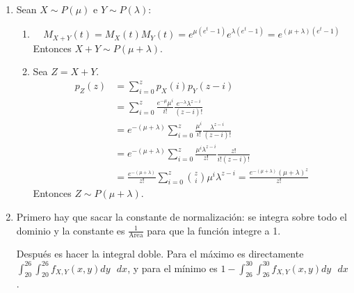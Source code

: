 \begin{enumerate}
	\item
		Sean $X\sim P(\mu)$ e $Y\sim P(\lambda)$:
		\begin{enumerate}
			\item
				$$M_{X+Y}(t) = M_X(t) M_Y(t) = e^{\mu(e^t-1)}e^{\lambda(e^t-1)} = e^{(\mu+\lambda)(e^t-1)}$$
				Entonces $X+Y\sim P(\mu+\lambda)$.
			\item
				Sea $Z = X+Y$.
				\begin{align*}
					p_Z(z)	& = \sum_{i=0}^z p_X(i)p_Y(z-i)	\\
							& = \sum_{i=0}^z \frac{e^{-\mu}\mu^i}{i!}\frac{e^{-\lambda}\lambda^{z-i}}{(z-i)!}	\\
							& = e^{-(\mu+\lambda)}\sum_{i=0}^z \frac{\mu^i}{i!}\frac{\lambda^{z-i}}{(z-i)!}		\\
							& = e^{-(\mu+\lambda)}\sum_{i=0}^z \frac{\mu^i\lambda^{z-i}}{z!} \frac{z!}{i!(z-i)!}		\\
							& = \frac{e^{-(\mu+\lambda)}}{z!}\sum_{i=0}^z \binom{z}{i}\mu^i\lambda^{z-i} = 	\frac{e^{-(\mu+\lambda)}(\mu+\lambda)^z}{z!}
				\end{align*}
				Entonces $Z\sim P(\mu+\lambda)$.
		\end{enumerate}
		
	\item
		Primero hay que sacar la constante de normalización: se integra sobre todo el dominio y la constante es $\frac{1}{\text{Area}}$ para que la función integre a 1.
		
		Después es hacer la integral doble. Para el máximo es directamente $\int_{20}^{26}\int_{20}^{26} f_{X,Y}(x,y) dy\text{ }dx$,
		y para el mínimo es $1 - \int_{26}^{30}\int_{26}^{30} f_{X,Y}(x,y) dy\text{ }dx$.
\end{enumerate}
